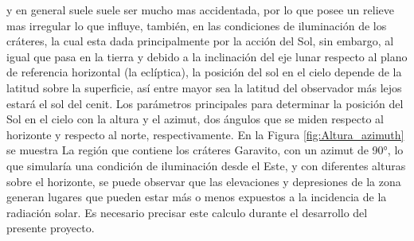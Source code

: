 \documentclass[12pt]{article}
\begin{document}
\parencite{LESLIE2019598} y en general suele suele ser mucho mas accidentada, por lo que posee un relieve 
mas irregular lo que influye, también, en las condiciones de 
iluminación de los cráteres, la cual esta dada principalmente por la acción del Sol, 
sin embargo, al igual que pasa en la tierra y debido a la inclinación del eje lunar respecto 
al plano de referencia horizontal (la eclíptica), la posición del sol en el cielo depende de la 
latitud  sobre la superficie, así entre mayor sea la latitud del 
observador más lejos estará el sol del cenit. Los parámetros principales para determinar  la 
posición del Sol en el cielo con la altura y el azimut, dos ángulos que se miden respecto 
al horizonte y respecto al norte, respectivamente\parencite{kolaczek1968selenocentric}. En la Figura 
\ref{fig:Altura_azimuth} se muestra 
La región que contiene los cráteres Garavito, con un azimut de 90°, lo que simularía una condición de 
iluminación desde el Este, y con diferentes alturas sobre el horizonte, se puede observar que 
las elevaciones y depresiones de la zona generan lugares que pueden estar más o menos 
expuestos a la incidencia de la radiación solar. Es necesario precisar este calculo durante el desarrollo 
del presente proyecto.\\
\end{document}
